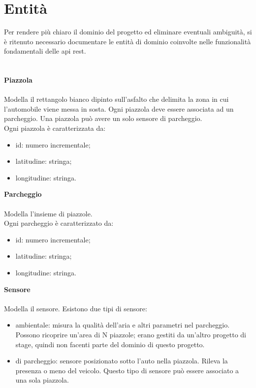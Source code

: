 \section{Entità}
Per rendere più chiaro il dominio del progetto ed eliminare eventuali ambiguità, si è ritenuto necessario
documentare le entità di dominio coinvolte nelle funzionalità fondamentali delle \gls{api} \gls{rest}.
\\\\\\
\textbf{Piazzola}
\\\\
Modella il rettangolo bianco dipinto sull'asfalto che delimita la zona in cui l'automobile viene messa
in sosta. Ogni piazzola deve essere associata ad un parcheggio. Una piazzola può avere un solo sensore
di parcheggio.
\\
Ogni piazzola è caratterizzata da:
\begin{itemize}
    \item id: numero incrementale;
    \item latitudine: stringa;
    \item longitudine: stringa.
\end{itemize}
\leavevmode\newline
\textbf{Parcheggio}
\\\\
Modella l'insieme di piazzole.
\\
Ogni parcheggio è caratterizzato da:
\begin{itemize}
    \item id: numero incrementale;
    \item latitudine: stringa;
    \item longitudine: stringa.
\end{itemize}
\leavevmode\newline
\textbf{Sensore}
\\\\
Modella il sensore. Esistono due tipi di sensore:
\begin{itemize}
    \item ambientale: misura la qualità dell'aria e altri parametri nel parcheggio. Possono 
        ricoprire un'area di N piazzole;
        erano gestiti da un'altro progetto di stage, quindi non facenti parte del dominio di questo progetto.
    \item di parcheggio: sensore posizionato sotto l'auto nella piazzola. Rileva la presenza o meno
        del veicolo. Questo tipo di sensore può essere associato a una sola piazzola.
\end{itemize}
